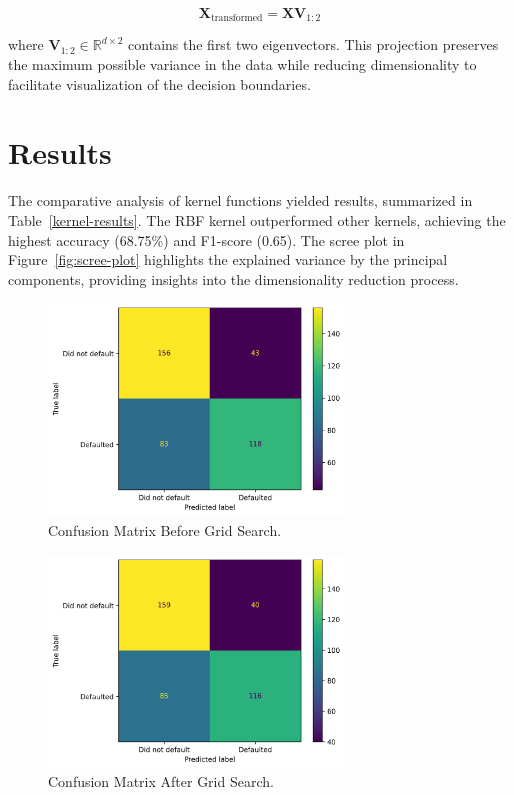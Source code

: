 \documentclass{article}
\begin{document}
\[
\mathbf{X}_{\text{transformed}} = \mathbf{X}\mathbf{V}_{1:2}
\]

where $\mathbf{V}_{1:2} \in \mathbb{R}^{d \times 2}$ contains the first two eigenvectors. This projection preserves the maximum possible variance in the data while reducing dimensionality to facilitate visualization of the decision boundaries.


\section{Results}
The comparative analysis of kernel functions yielded results, summarized in Table~\ref{kernel-results}. The RBF kernel outperformed other kernels, achieving the highest accuracy (68.75\%) and F1-score (0.65). 
The scree plot in Figure~\ref{fig:scree-plot} highlights the explained variance by the principal components, providing insights into the dimensionality reduction process.

\begin{figure}[H]
    \centering
    \includegraphics[width=0.7\textwidth]{../figures/confusion_matrix_pre_gridSearch.png}
    \caption{Confusion Matrix Before Grid Search.}
    \label{fig:confusion-pre-grid}
\end{figure}

\begin{figure}[H]
    \centering
    \includegraphics[width=0.7\textwidth]{../figures/confusion_matrix_post_gridSearch.png}
    \caption{Confusion Matrix After Grid Search.}
    \label{fig:confusion-post-grid}
\end{figure}
\end{document}
